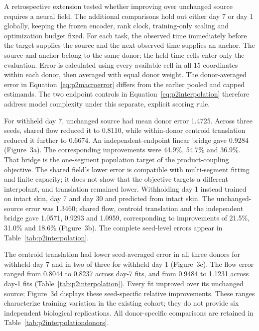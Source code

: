 \documentclass[10pt,a4paper]{article}
\begin{document}
A retrospective extension tested whether improving over unchanged source requires a neural field. The additional comparisons hold out either day 7 or day 1 globally, keeping the frozen encoder, rank clock, training-only scaling and optimization budget fixed. For each task, the observed time immediately before the target supplies the source and the next observed time supplies an anchor. The source and anchor belong to the same donor; the held-time cells enter only the evaluation. Error is calculated using every available cell in all 15 coordinates within each donor, then averaged with equal donor weight. The donor-averaged error in Equation~\eqref{eq:p2macroerror} differs from the earlier pooled and capped estimands. The two endpoint controls in Equation~\eqref{eq:p2interpolation} therefore address model complexity under this separate, explicit scoring rule.

For withheld day 7, unchanged source had mean donor error 1.4725. Across three seeds, shared flow reduced it to 0.8110, while within-donor centroid translation reduced it further to 0.6674. An independent-endpoint linear bridge gave 0.9284 (Figure~3a\label{call:p2f3}). The corresponding improvements were 44.9\%, 54.7\% and 36.9\%. That bridge is the one-segment population target of the product-coupling objective. The shared field's lower error is compatible with multi-segment fitting and finite capacity; it does not show that the objective targets a different interpolant, and translation remained lower. Withholding day 1 instead trained on intact skin, day 7 and day 30 and predicted from intact skin. The unchanged-source error was 1.3460; shared flow, centroid translation and the independent bridge gave 1.0571, 0.9293 and 1.0959, corresponding to improvements of 21.5\%, 31.0\% and 18.6\% (Figure~3b). The complete seed-level errors appear in Table~\ref{tab:p2interpolation}.




The centroid translation had lower seed-averaged error in all three donors for withheld day 7 and in two of three for withheld day 1 (Figure~3c). The flow error ranged from 0.8044 to 0.8237 across day-7 fits, and from 0.9484 to 1.1231 across day-1 fits (Table~\ref{tab:p2interpolation}). Every fit improved over its unchanged source; Figure~3d displays these seed-specific relative improvements. These ranges characterize training variation in the existing cohort; they do not provide six independent biological replications. All donor-specific comparisons are retained in Table~\ref{tab:p2interpolationdonors}.
\end{document}
